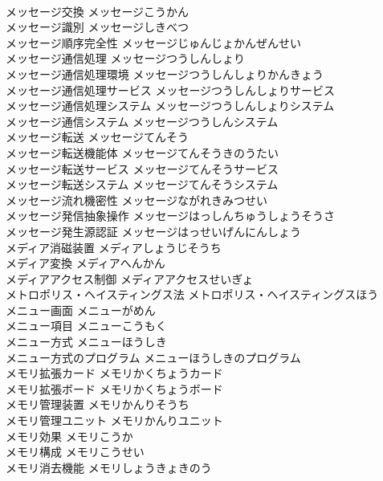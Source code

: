 \documentclass[8pt]{extreport}
\begin{document}
\begin{CJK}{UTF8}{min}
\\	メッセージ交換	メッセージこうかん	
\\	メッセージ識別	メッセージしきべつ	
\\	メッセージ順序完全性	メッセージじゅんじょかんぜんせい	
\\	メッセージ通信処理	メッセージつうしんしょり	
\\	メッセージ通信処理環境	メッセージつうしんしょりかんきょう	
\\	メッセージ通信処理サービス	メッセージつうしんしょりサービス	
\\	メッセージ通信処理システム	メッセージつうしんしょりシステム	
\\	メッセージ通信システム	メッセージつうしんシステム	
\\	メッセージ転送	メッセージてんそう	
\\	メッセージ転送機能体	メッセージてんそうきのうたい	
\\	メッセージ転送サービス	メッセージてんそうサービス	
\\	メッセージ転送システム	メッセージてんそうシステム	
\\	メッセージ流れ機密性	メッセージながれきみつせい	
\\	メッセージ発信抽象操作	メッセージはっしんちゅうしょうそうさ	
\\	メッセージ発生源認証	メッセージはっせいげんにんしょう	
\\	メディア消磁装置	メディアしょうじそうち	
\\	メディア変換	メディアへんかん	
\\	メディアアクセス制御	メディアアクセスせいぎょ	
\\	メトロポリス・ヘイスティングス法	メトロポリス・ヘイスティングスほう	
\\	メニュー画面	メニューがめん	
\\	メニュー項目	メニューこうもく	
\\	メニュー方式	メニューほうしき	
\\	メニュー方式のプログラム	メニューほうしきのプログラム	
\\	メモリ拡張カード	メモリかくちょうカード	
\\	メモリ拡張ボード	メモリかくちょうボード	
\\	メモリ管理装置	メモリかんりそうち	
\\	メモリ管理ユニット	メモリかんりユニット	
\\	メモリ効果	メモリこうか	
\\	メモリ構成	メモリこうせい	
\\	メモリ消去機能	メモリしょうきょきのう	

\end{CJK}
\end{document}
